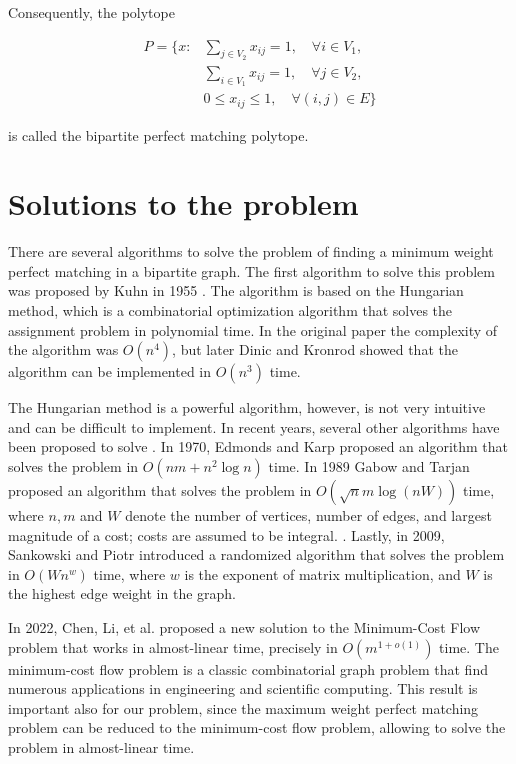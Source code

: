 Consequently, the polytope

\begin{equation}
    \begin{aligned}
        P = \{ x: & \sum_{j \in V_2} x_{ij} = 1, \quad \forall i \in V_1, \\
        & \sum_{i \in V_1} x_{ij} = 1, \quad \forall j \in V_2, \\
        & 0 \leq x_{ij} \leq 1, \quad \forall (i, j) \in E \}
    \end{aligned}
\end{equation}

is called the bipartite perfect matching polytope. 

\section{Solutions to the problem}
There are several algorithms to solve the problem of finding a minimum weight perfect matching in a bipartite graph. The first algorithm to solve this problem was proposed by Kuhn in 1955 \cite{kuhn1955hungarian}. The algorithm is based on the Hungarian method, which is a combinatorial optimization algorithm that solves the assignment problem in polynomial time. In the original paper the complexity of the algorithm was $O(n^4)$, but later Dinic and Kronrod \cite{dinic1969algorithm} showed that the algorithm can be implemented in $O(n^3)$ time.

The Hungarian method is a powerful algorithm, however,  is not very intuitive and can be difficult to implement. In recent years, several other algorithms have been proposed to solve . In 1970, Edmonds and Karp \cite{edmonds1972theoretical} proposed an algorithm that solves the problem in $O(nm + n^2 \log n)$ time. In 1989 Gabow and Tarjan \cite{gabow1989faster} proposed an algorithm that solves the problem in $O(\sqrt{n}m \log(nW))$ time,  where $n,m$ and $W$ denote the number of vertices, number of edges, and largest magnitude of a cost; costs are assumed to be integral. . Lastly, in 2009, Sankowski and Piotr \cite{sankowski2009maximum} introduced a randomized algorithm that solves the problem in $O(Wn^w)$ time, where $w$ is the exponent of matrix multiplication, and $W$ is the highest edge weight in the graph.

In 2022, Chen, Li, et al. \cite{chen2022maximum} proposed a new solution to the Minimum-Cost Flow problem that works in almost-linear time, precisely in $O(m^{1+o(1)})$ time. The minimum-cost flow problem is a classic combinatorial graph problem that find numerous applications in engineering and scientific computing. This result is important also for our problem, since the maximum weight perfect matching problem can be reduced to the minimum-cost flow problem, allowing to solve the problem in almost-linear time.

